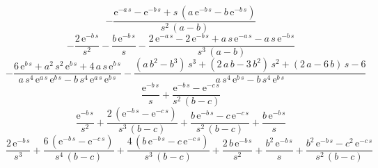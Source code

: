 \documentclass[]{article}
\begin{document}
\begin{equation}
  -\frac{\mathrm{e}^{- a\, s} - \mathrm{e}^{- b\, s} + s\, \left(a\, 
  \mathrm{e}^{- b\, s} - b\, \mathrm{e}^{- b\, s}\right)}{s^2\, \left(a - 
  b\right)}
\end{equation}
\begin{equation}
  - \frac{2\, \mathrm{e}^{- b\, s}}{s^2} - \frac{b\, \mathrm{e}^{- b\, 
  s}}{s} - \frac{2\, \mathrm{e}^{- a\, s} - 2\, \mathrm{e}^{- b\, s} + a\, 
  s\, \mathrm{e}^{- a\, s} - a\, s\, \mathrm{e}^{- b\, s}}{s^3\, \left(a - 
  b\right)}
\end{equation}
\begin{equation}
  - \frac{6\, \mathrm{e}^{b\, s} + a^2\, s^2\, \mathrm{e}^{b\, s} + 4\, a\, 
  s\, \mathrm{e}^{b\, s}}{a\, s^4\, \mathrm{e}^{a\, s}\, \mathrm{e}^{b\, s} 
  - b\, s^4\, \mathrm{e}^{a\, s}\, \mathrm{e}^{b\, s}} - \frac{\left(a\, 
    b^2 - b^3\right)\, s^3 + \left(2\, a\, b - 3\, b^2\right)\, s^2 + 
  \left(2\, a - 6\, b\right)\, s - 6}{a\, s^4\, \mathrm{e}^{b\, s} - b\, 
  s^4\, \mathrm{e}^{b\, s}}
\end{equation}
\begin{equation}
  \frac{\mathrm{e}^{- b\, s}}{s} + \frac{\mathrm{e}^{- b\, s} - 
  \mathrm{e}^{- c\, s}}{s^2\, \left(b - c\right)}
\end{equation}
\begin{equation}
  \frac{\mathrm{e}^{- b\, s}}{s^2} + \frac{2\, \left(\mathrm{e}^{- b\, s} - 
  \mathrm{e}^{- c\, s}\right)}{s^3\, \left(b - c\right)} + \frac{b\, 
    \mathrm{e}^{- b\, s} - c\, \mathrm{e}^{- c\, s}}{s^2\, \left(b - 
    c\right)} + \frac{b\, \mathrm{e}^{- b\, s}}{s}
\end{equation}
\begin{equation}
  \frac{2\, \mathrm{e}^{- b\, s}}{s^3} + \frac{6\, \left(\mathrm{e}^{- b\, 
  s} - \mathrm{e}^{- c\, s}\right)}{s^4\, \left(b - c\right)} + \frac{4\, 
    \left(b\, \mathrm{e}^{- b\, s} - c\, \mathrm{e}^{- c\, s}\right)}{s^3\, 
    \left(b - c\right)} + \frac{2\, b\, \mathrm{e}^{- b\, s}}{s^2} + 
    \frac{b^2\, \mathrm{e}^{- b\, s}}{s} + \frac{b^2\, \mathrm{e}^{- b\, s} 
    - c^2\, \mathrm{e}^{- c\, s}}{s^2\, \left(b - c\right)}
\end{equation}
\end{document}

